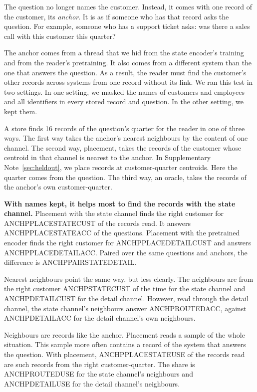 \documentclass[11pt]{article}
\begin{document}
The question no longer names the customer. Instead, it comes with one record of the customer, its \emph{anchor}. It is as if someone who has that record asks the question. For example, someone who has a support ticket asks: was there a sales call with this customer this quarter?

The anchor comes from a thread that we hid from the state encoder's training and from the reader's pretraining. It also comes from a different system than the one that answers the question. As a result, the reader must find the customer's other records across systems from one record without its link. We ran this test in two settings. In one setting, we masked the names of customers and employees and all identifiers in every stored record and question. In the other setting, we kept them.

A store finds 16 records of the question's quarter for the reader in one of three ways. The first way takes the anchor's nearest neighbours by the content of one channel. The second way, placement, takes the records of the customer whose centroid in that channel is nearest to the anchor. In Supplementary Note~\ref{sec:heldout}, we place records at customer-quarter centroids. Here the quarter comes from the question. The third way, an oracle, takes the records of the anchor's own customer-quarter.

\textbf{With names kept, it helps most to find the records with the state channel.} Placement with the state channel finds the right customer for ANCHPPLACESTATECUST of the records read. It answers ANCHPPLACESTATEACC of the questions. Placement with the pretrained encoder finds the right customer for ANCHPPLACEDETAILCUST and answers ANCHPPLACEDETAILACC. Paired over the same questions and anchors, the difference is ANCHPPAIRSTATEDETAIL.

Nearest neighbours point the same way, but less clearly. The neighbours are from the right customer ANCHPSTATECUST of the time for the state channel and ANCHPDETAILCUST for the detail channel. However, read through the detail channel, the state channel's neighbours answer ANCHPROUTEDACC, against ANCHPDETAILACC for the detail channel's own neighbours.

Neighbours are records like the anchor. Placement reads a sample of the whole situation. This sample more often contains a record of the system that answers the question. With placement, ANCHPPLACESTATEUSE of the records read are such records from the right customer-quarter. The share is ANCHPROUTEDUSE for the state channel's neighbours and ANCHPDETAILUSE for the detail channel's neighbours.
\end{document}
